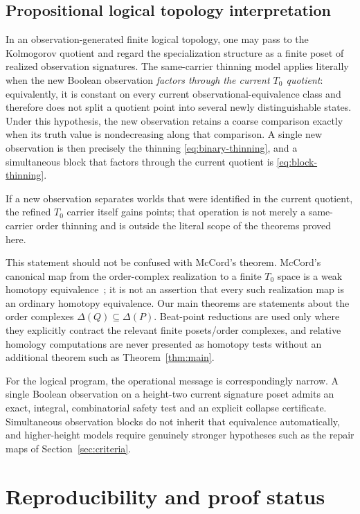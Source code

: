 \documentclass[11pt]{article}
\theoremstyle{definition}
\theoremstyle{remark}
\newcommand{\D}{\Delta}
\begin{document}
\subsection{Propositional logical topology interpretation}

In an observation-generated finite logical topology, one may pass to the Kolmogorov
quotient and regard the specialization structure as a finite poset of realized
observation signatures.  The same-carrier thinning model applies literally when the
new Boolean observation \emph{factors through the current $T_0$ quotient}: equivalently,
it is constant on every current observational-equivalence class and therefore does
not split a quotient point into several newly distinguishable states.  Under this
hypothesis, the new observation retains a coarse comparison exactly when its truth
value is nondecreasing along that comparison.  A single new observation is then
precisely the thinning \eqref{eq:binary-thinning}, and a simultaneous block that
factors through the current quotient is \eqref{eq:block-thinning}.

If a new observation separates worlds that were identified in the current quotient,
the refined $T_0$ carrier itself gains points; that operation is not merely a
same-carrier order thinning and is outside the literal scope of the theorems proved
here.

This statement should not be confused with McCord's theorem.  McCord's canonical map
from the order-complex realization to a finite $T_0$ space is a weak homotopy
equivalence~\cite{McCord1966}; it is not an assertion that every such realization map
is an ordinary homotopy equivalence.  Our main theorems are statements about the
order complexes $\D(Q)\subseteq\D(P)$.  Beat-point reductions are used only where they
explicitly contract the relevant finite posets/order complexes, and relative homology
computations are never presented as homotopy tests without an additional theorem such
as Theorem~\ref{thm:main}.

For the logical program, the operational message is correspondingly narrow.  A single
Boolean observation on a height-two current signature poset admits an exact, integral,
combinatorial safety test and an explicit collapse certificate.  Simultaneous
observation blocks do not inherit that equivalence automatically, and higher-height
models require genuinely stronger hypotheses such as the repair maps of
Section~\ref{sec:criteria}.

\section{Reproducibility and proof status}\label{sec:repro}
\end{document}

